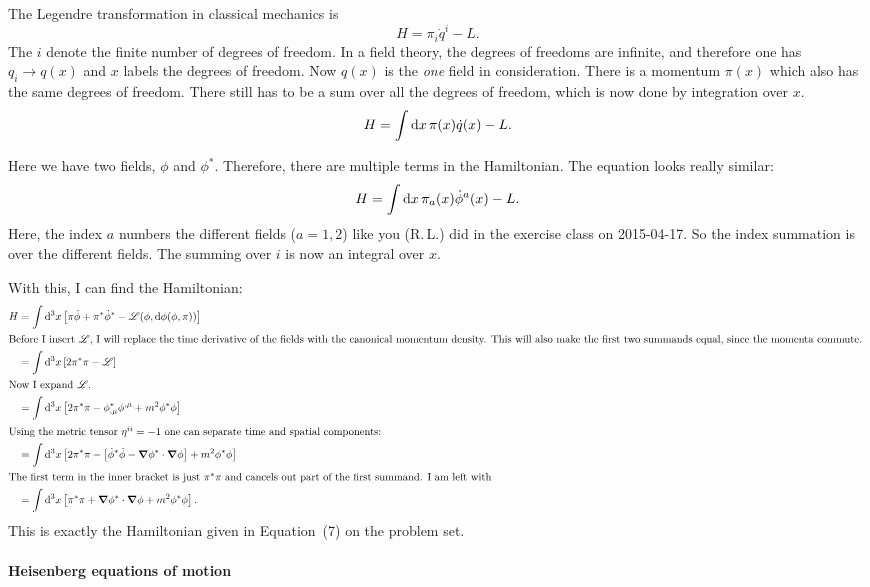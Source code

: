 \documentclass[11pt, english, fleqn, DIV=15, headinclude, BCOR=1cm]{scrartcl}
\begin{document}
The Legendre transformation in classical mechanics is
\[
    H = \pi_i \dot q^i - L.
\]
The $i$ denote the finite number of degrees of freedom. In a field theory, the
degrees of freedoms are infinite, and therefore one has $q_i \to q(x)$ and $x$
labels the degrees of freedom. Now $q(x)$ is the \emph{one} field in
consideration. There is a momentum $\pi(x)$ which also has the same degrees of
freedom. There still has to be a sum over all the degrees of freedom, which is
now done by integration over $x$.
\[
    H = \int \mathop{}\!\mathrm d x \, \pi(x) \dot q(x) - L.
\]

Here we have two fields, $\phi$ and $\phi^*$. Therefore, there are multiple
terms in the Hamiltonian. The equation looks really similar:
\[
    H = \int \mathop{}\!\mathrm d x \, \pi_a(x) \dot \phi^a(x) - L.
\]
Here, the index $a$ numbers the different fields ($a = 1, 2$) like you (R.\,L.)
did in the exercise class on 2015-04-17. So the index summation is over the
different fields. The summing over $i$ is now an integral over $x$.

With this, I can find the Hamiltonian:
\begin{align*}
    H
    &= \int \dif^3 x \sbr{\pi \dot \phi + \pi^* \dot\phi^* - \mathscr L(\phi, \dif \phi(\phi,
    \pi))} \\
    \intertext{%
        Before I insert $\mathscr L$, I will replace the time derivative of the
        fields with the canonical momentum density. This will also make the
        first two summands equal, since the momenta commute.
    }
    &= \int \dif^3 x \sbr{2 \pi^* \pi - \mathscr L} \\
    \intertext{%
        Now I expand $\mathscr L$.
    }
    &= \int \dif^3 x \sbr{2 \pi^* \pi - \phi^*_{,\mu} \phi^{,\mu} +
    m^2 \phi^* \phi} \\
    \intertext{%
        Using the metric tensor $\eta^{ii} = -1$ one can separate time and
        spatial components:
    }
    &= \int \dif^3 x \sbr{2 \pi^* \pi - \sbr{\dot \phi^* \dot \phi - \vnabla \phi^* \cdot
    \vnabla \phi} + m^2 \phi^* \phi} \\
    \intertext{%
        The first term in the inner bracket is just $\pi^* \pi$ and cancels out
        part of the first summand. I am left with
    }
    &= \int \dif^3 x \sbr{ \pi^* \pi + \vnabla \phi^* \cdot \vnabla \phi + m^2 \phi^* \phi}.
\end{align*}
This is exactly the Hamiltonian given in Equation~(7) on the problem set.

\paragraph{Heisenberg equations of motion}
\end{document}
